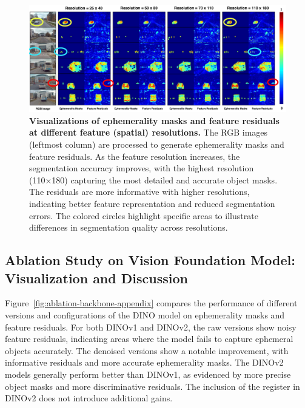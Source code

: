 \vspace{5mm}
\begin{figure}[ht]
\begin{center}
\centerline{\includegraphics[width=\columnwidth]{figs_compressed/ablation-resolution_compressed.pdf}}
\caption{\textbf{Visualizations of ephemerality masks and feature residuals at different feature (spatial) resolutions.} The RGB images (leftmost column) are processed to generate ephemerality masks and feature residuals. As the feature resolution increases, the segmentation accuracy improves, with the highest resolution (110×180) capturing the most detailed and accurate object masks. The residuals are more informative with higher resolutions, indicating better feature representation and reduced segmentation errors. The colored circles highlight specific areas to illustrate differences in segmentation quality across resolutions.}
\label{fig:ablation-resolution-appendix}
\end{center}
\end{figure}



\clearpage






\subsection{Ablation Study on Vision Foundation Model: Visualization and Discussion}

Figure~\ref{fig:ablation-backbone-appendix} compares the performance of different versions and configurations of the DINO model on ephemerality masks and feature residuals. For both DINOv1 and DINOv2, the raw versions show noisy feature residuals, indicating areas where the model fails to capture ephemeral objects accurately. The denoised versions show a notable improvement, with informative residuals and more accurate ephemerality masks. The DINOv2 models generally perform better than DINOv1, as evidenced by more precise object masks and more discriminative residuals. The inclusion of the register in DINOv2 does not introduce additional gains.

